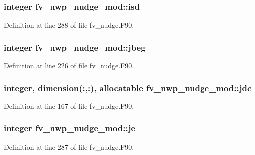 \subsubsection[{isd}]{\setlength{\rightskip}{0pt plus 5cm}integer fv\-\_\-nwp\-\_\-nudge\-\_\-mod\-::isd\hspace{0.3cm}{\ttfamily [private]}}\label{classfv__nwp__nudge__mod_a7d1486af2ea75f210ba0c7d08952fe68}


Definition at line 288 of file fv\-\_\-nudge.\-F90.

\subsubsection[{jbeg}]{\setlength{\rightskip}{0pt plus 5cm}integer fv\-\_\-nwp\-\_\-nudge\-\_\-mod\-::jbeg\hspace{0.3cm}{\ttfamily [private]}}\label{classfv__nwp__nudge__mod_a70bc4acdd2e6d0dfffe5632d08ce50af}


Definition at line 226 of file fv\-\_\-nudge.\-F90.

\subsubsection[{jdc}]{\setlength{\rightskip}{0pt plus 5cm}integer, dimension(\-:,\-:), allocatable fv\-\_\-nwp\-\_\-nudge\-\_\-mod\-::jdc\hspace{0.3cm}{\ttfamily [private]}}\label{classfv__nwp__nudge__mod_a046fc8ca32888e97b3af454cfca83aae}


Definition at line 167 of file fv\-\_\-nudge.\-F90.

\subsubsection[{je}]{\setlength{\rightskip}{0pt plus 5cm}integer fv\-\_\-nwp\-\_\-nudge\-\_\-mod\-::je\hspace{0.3cm}{\ttfamily [private]}}\label{classfv__nwp__nudge__mod_aec115c5d43df5f25250c9a3cd359f177}


Definition at line 287 of file fv\-\_\-nudge.\-F90.

